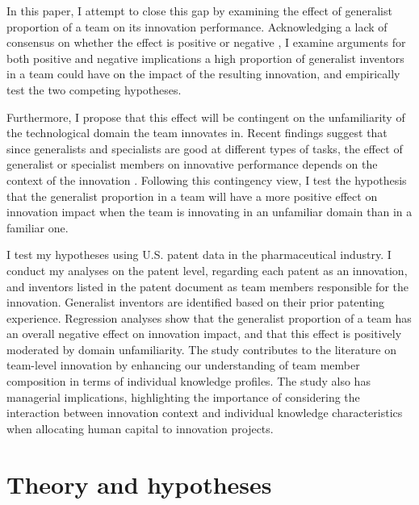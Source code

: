 \documentclass{article}
\begin{document}
In this paper, I attempt to close this gap by examining the effect of generalist proportion of a team on its innovation performance. Acknowledging a lack of consensus on whether the effect is positive \autocite{Melero2015,Nagle2020} or negative \autocite{Jones2009,Leahey2007,Conti2014}, I examine arguments for both positive and negative implications a high proportion of generalist inventors in a team could have on the impact of the resulting innovation, and empirically test the two competing hypotheses.

Furthermore, I propose that this effect will be contingent on the unfamiliarity of the technological domain the team innovates in. Recent findings suggest that since generalists and specialists are good at different types of tasks, the effect of generalist or specialist members on innovative performance depends on the context of the innovation \autocite{Teodoridis2019,Vakili2021,Mannucci2018}. Following this contingency view, I test the hypothesis that the generalist proportion in a team will have a more positive effect on innovation impact when the team is innovating in an unfamiliar domain than in a familiar one.

I test my hypotheses using U.S. patent data in the pharmaceutical industry. I conduct my analyses on the patent level, regarding each patent as an innovation, and inventors listed in the patent document as team members responsible for the innovation. Generalist inventors are identified based on their prior patenting experience. Regression analyses show that the generalist proportion of a team has an overall negative effect on innovation impact, and that this effect is positively moderated by domain unfamiliarity. The study contributes to the literature on team-level innovation by enhancing our understanding of team member composition in terms of individual knowledge profiles. The study also has managerial implications, highlighting the importance of considering the interaction between innovation context and individual knowledge characteristics when allocating human capital to innovation projects.

\section{Theory and hypotheses}
\end{document}

